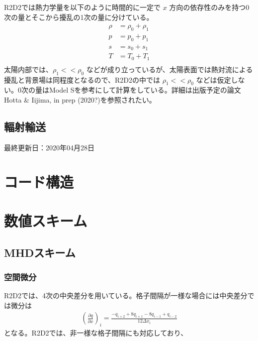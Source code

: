 \documentclass[letterpaper,10pt,dvipdfmx,report]{sphinxmanual}
\begin{document}
R2D2では熱力学量を以下のように時間的に一定で \(x\) 方向の依存性のみを持つ0次の量とそこから擾乱の1次の量に分けている。
\begin{equation*}
\begin{split}\rho &= \rho_0 + \rho_1 \\
p &= p_0 + p_1 \\
s &= s_0 + s_1 \\
T &= T_0 + T_1 \\\end{split}
\end{equation*}
太陽内部では、\(\rho_1 << \rho_0\) などが成り立っているが、太陽表面では熱対流による擾乱と背景場は同程度となるので、R2D2の中では \(\rho_1 << \rho_0\) などは仮定しない。0次の量はModel Sを参考にして計算をしている。詳細は出版予定の論文Hotta \& Iijima, in prep (2020?)を参照されたい。


\section{輻射輸送}
\label{\detokenize{equation:id3}}
最終更新日：2020年04月28日


\chapter{コード構造}
\label{\detokenize{code:id1}}\label{\detokenize{code::doc}}

\chapter{数値スキーム}
\label{\detokenize{scheme:id1}}\label{\detokenize{scheme::doc}}

\section{MHDスキーム}
\label{\detokenize{scheme:mhd}}

\subsection{空間微分}
\label{\detokenize{scheme:id2}}
R2D2では、4次の中央差分を用いている。格子間隔が一様な場合には中央差分では微分は
\begin{equation*}
\begin{split}\left(\frac{\partial q}{\partial x}\right)_i =\frac{-q_{i+2}+8q_{i+1}-8q_{i-1}+q_{i-2}}{12\Delta x_i}\end{split}
\end{equation*}
となる。R2D2では、非一様な格子間隔にも対応しており、
\end{document}
